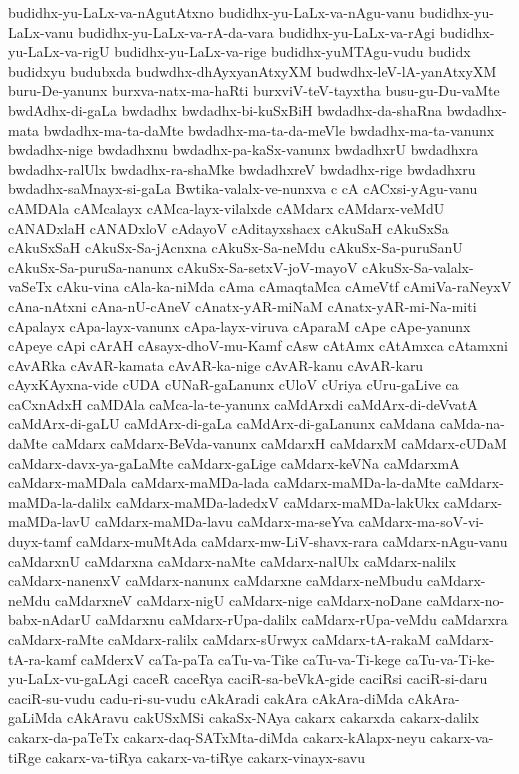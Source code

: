 {budidhx-yu-LaLx-va-nAgutAtxno
budidhx-yu-LaLx-va-nAgu-vanu
budidhx-yu-LaLx-vanu
budidhx-yu-LaLx-va-rA-da-vara
budidhx-yu-LaLx-va-rAgi
budidhx-yu-LaLx-va-rigU
budidhx-yu-LaLx-va-rige
budidhx-yuMTAgu-vudu
budidx
budidxyu
budubxda
budwdhx-dhAyxyanAtxyXM
budwdhx-leV-lA-yanAtxyXM
buru-De-yanunx
burxva-natx-ma-haRti
burxviV-teV-tayxtha
busu-gu-Du-vaMte
bwdAdhx-di-gaLa
bwdadhx
bwdadhx-bi-kuSxBiH
bwdadhx-da-shaRna
bwdadhx-mata
bwdadhx-ma-ta-daMte
bwdadhx-ma-ta-da-meVle
bwdadhx-ma-ta-vanunx
bwdadhx-nige
bwdadhxnu
bwdadhx-pa-kaSx-vanunx
bwdadhxrU
bwdadhxra
bwdadhx-ralUlx
bwdadhx-ra-shaMke
bwdadhxreV
bwdadhx-rige
bwdadhxru
bwdadhx-saMnayx-si-gaLa
Bwtika-valalx-ve-nunxva
c
cA
cACxsi-yAgu-vanu
cAMDAla
cAMcalayx
cAMca-layx-vilalxde
cAMdarx
cAMdarx-veMdU
cANADxlaH
cANADxloV
cAdayoV
cAditayxshacx
cAkuSaH
cAkuSxSa
cAkuSxSaH
cAkuSx-Sa-jAcnxna
cAkuSx-Sa-neMdu
cAkuSx-Sa-puruSanU
cAkuSx-Sa-puruSa-nanunx
cAkuSx-Sa-setxV-joV-mayoV
cAkuSx-Sa-valalx-vaSeTx
cAku-vina
cAla-ka-niMda
cAma
cAmaqtaMca
cAmeVtf
cAmiVa-raNeyxV
cAna-nAtxni
cAna-nU-cAneV
cAnatx-yAR-miNaM
cAnatx-yAR-mi-Na-miti
cApalayx
cApa-layx-vanunx
cApa-layx-viruva
cAparaM
cApe
cApe-yanunx
cApeye
cApi
cArAH
cAsayx-dhoV-mu-Kamf
cAsw
cAtAmx
cAtAmxca
cAtamxni
cAvARka
cAvAR-kamata
cAvAR-ka-nige
cAvAR-kanu
cAvAR-karu
cAyxKAyxna-vide
cUDA
cUNaR-gaLanunx
cUloV
cUriya
cUru-gaLive
ca
caCxnAdxH
caMDAla
caMca-la-te-yanunx
caMdArxdi
caMdArx-di-deVvatA
caMdArx-di-gaLU
caMdArx-di-gaLa
caMdArx-di-gaLanunx
caMdana
caMda-na-daMte
caMdarx
caMdarx-BeVda-vanunx
caMdarxH
caMdarxM
caMdarx-cUDaM
caMdarx-davx-ya-gaLaMte
caMdarx-gaLige
caMdarx-keVNa
caMdarxmA
caMdarx-maMDala
caMdarx-maMDa-lada
caMdarx-maMDa-la-daMte
caMdarx-maMDa-la-dalilx
caMdarx-maMDa-ladedxV
caMdarx-maMDa-lakUkx
caMdarx-maMDa-lavU
caMdarx-maMDa-lavu
caMdarx-ma-seYva
caMdarx-ma-soV-vi-duyx-tamf
caMdarx-muMtAda
caMdarx-mw-LiV-shavx-rara
caMdarx-nAgu-vanu
caMdarxnU
caMdarxna
caMdarx-naMte
caMdarx-nalUlx
caMdarx-nalilx
caMdarx-nanenxV
caMdarx-nanunx
caMdarxne
caMdarx-neMbudu
caMdarx-neMdu
caMdarxneV
caMdarx-nigU
caMdarx-nige
caMdarx-noDane
caMdarx-no-babx-nAdarU
caMdarxnu
caMdarx-rUpa-dalilx
caMdarx-rUpa-veMdu
caMdarxra
caMdarx-raMte
caMdarx-ralilx
caMdarx-sUrwyx
caMdarx-tA-rakaM
caMdarx-tA-ra-kamf
caMderxV
caTa-paTa
caTu-va-Tike
caTu-va-Ti-kege
caTu-va-Ti-ke-yu-LaLx-vu-gaLAgi
caceR
caceRya
caciR-sa-beVkA-gide
caciRsi
caciR-si-daru
caciR-su-vudu
cadu-ri-su-vudu
cAkAradi
cakAra
cAkAra-diMda
cAkAra-gaLiMda
cAkAravu
cakUSxMSi
cakaSx-NAya
cakarx
cakarxda
cakarx-dalilx
cakarx-da-paTeTx
cakarx-daq-SATxMta-diMda
cakarx-kAlapx-neyu
cakarx-va-tiRge
cakarx-va-tiRya
cakarx-va-tiRye
cakarx-vinayx-savu
}
